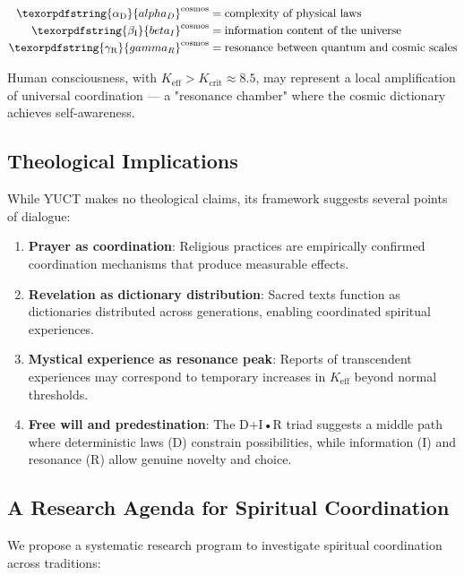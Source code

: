 \documentclass[12pt,a4paper]{article}
\DeclareRobustCommand{\alD}{\texorpdfstring{\ensuremath{\alpha_{\mathrm{D}}}}{alpha_D}}
\DeclareRobustCommand{\beI}{\texorpdfstring{\ensuremath{\beta_{\mathrm{I}}}}{beta_I}}
\DeclareRobustCommand{\gaR}{\texorpdfstring{\ensuremath{\gamma_{\mathrm{R}}}}{gamma_R}}
\newcommand{\Kcrit}{K_{\mathrm{crit}}}
\begin{document}
	\begin{align*}
		\alD^{\mathrm{cosmos}} &= \text{complexity of physical laws} \\
		\beI^{\mathrm{cosmos}} &= \text{information content of the universe} \\
		\gaR^{\mathrm{cosmos}} &= \text{resonance between quantum and cosmic scales}
	\end{align*}
	
	Human consciousness, with $K_{\mathrm{eff}} > \Kcrit \approx 8.5$, may represent a local amplification of universal coordination — a "resonance chamber" where the cosmic dictionary achieves self-awareness.
	
	\subsection{Theological Implications}
	
	While YUCT makes no theological claims, its framework suggests several points of dialogue:
	
	\begin{enumerate}
		\item \textbf{Prayer as coordination}: Religious practices are empirically confirmed coordination mechanisms that produce measurable effects.
		
		\item \textbf{Revelation as dictionary distribution}: Sacred texts function as dictionaries distributed across generations, enabling coordinated spiritual experiences.
		
		\item \textbf{Mystical experience as resonance peak}: Reports of transcendent experiences may correspond to temporary increases in $K_{\mathrm{eff}}$ beyond normal thresholds.
		
		\item \textbf{Free will and predestination}: The D+I•R triad suggests a middle path where deterministic laws (D) constrain possibilities, while information (I) and resonance (R) allow genuine novelty and choice.
	\end{enumerate}
	
	\subsection{A Research Agenda for Spiritual Coordination}
	
	We propose a systematic research program to investigate spiritual coordination across traditions:
	
\end{document}
